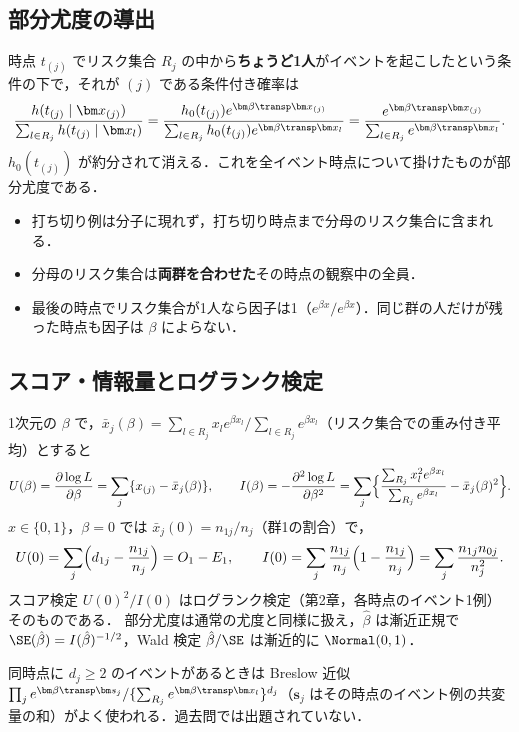 \subsection{部分尤度の導出}
時点 $t_{(j)}$ でリスク集合 $R_j$ の中から\textbf{ちょうど1人}がイベントを起こしたという条件の下で，それが $(j)$ である条件付き確率は
\[
\frac{h(t_{(j)}\mid\bm x_{(j)})}{\sum_{l\in R_j}h(t_{(j)}\mid\bm x_l)}
=\frac{h_0(t_{(j)})e^{\bm\beta\transp\bm x_{(j)}}}{\sum_{l\in R_j}h_0(t_{(j)})e^{\bm\beta\transp\bm x_l}}
=\frac{e^{\bm\beta\transp\bm x_{(j)}}}{\sum_{l\in R_j}e^{\bm\beta\transp\bm x_l}} .
\]
$h_0(t_{(j)})$ が約分されて消える．これを全イベント時点について掛けたものが部分尤度である．
\begin{itemize}
\item 打ち切り例は分子に現れず，打ち切り時点まで分母のリスク集合に含まれる．
\item 分母のリスク集合は\textbf{両群を合わせた}その時点の観察中の全員．
\item 最後の時点でリスク集合が1人なら因子は1（$e^{\beta x}/e^{\beta x}$）．同じ群の人だけが残った時点も因子は $\beta$ によらない．
\end{itemize}

\subsection{スコア・情報量とログランク検定}
1次元の $\beta$ で，$\bar x_j(\beta)=\sum_{l\in R_j}x_le^{\beta x_l}\big/\sum_{l\in R_j}e^{\beta x_l}$（リスク集合での重み付き平均）とすると
\[
U(\beta)=\frac{\partial\log L}{\partial\beta}=\sum_j\{x_{(j)}-\bar x_j(\beta)\},\qquad
I(\beta)=-\frac{\partial^2\log L}{\partial\beta^2}=\sum_j\Bigl\{\frac{\sum_{R_j}x_l^2e^{\beta x_l}}{\sum_{R_j}e^{\beta x_l}}-\bar x_j(\beta)^2\Bigr\}.
\]
$x\in\{0,1\}$，$\beta=0$ では $\bar x_j(0)=n_{1j}/n_j$（群1の割合）で，
\[
U(0)=\sum_j\Bigl(d_{1j}-\frac{n_{1j}}{n_j}\Bigr)=O_1-E_1,\qquad
I(0)=\sum_j\frac{n_{1j}}{n_j}\Bigl(1-\frac{n_{1j}}{n_j}\Bigr)=\sum_j\frac{n_{1j}n_{0j}}{n_j^2}.
\]
スコア検定 $U(0)^2/I(0)$ はログランク検定（第2章，各時点のイベント1例）そのものである．
部分尤度は通常の尤度と同様に扱え，$\hat\beta$ は漸近正規で $\SE(\hat\beta)=I(\hat\beta)^{-1/2}$，Wald 検定 $\hat\beta/\SE$ は漸近的に $\Normal(0,1)$．
\begin{supbox}[補足：同時点のイベント]
同時点に $d_j\ge2$ のイベントがあるときは Breslow 近似 $\prod_j e^{\bm\beta\transp\bm s_j}/\{\sum_{R_j}e^{\bm\beta\transp\bm x_l}\}^{d_j}$（$\bm s_j$ はその時点のイベント例の共変量の和）がよく使われる．過去問では出題されていない．
\end{supbox}

